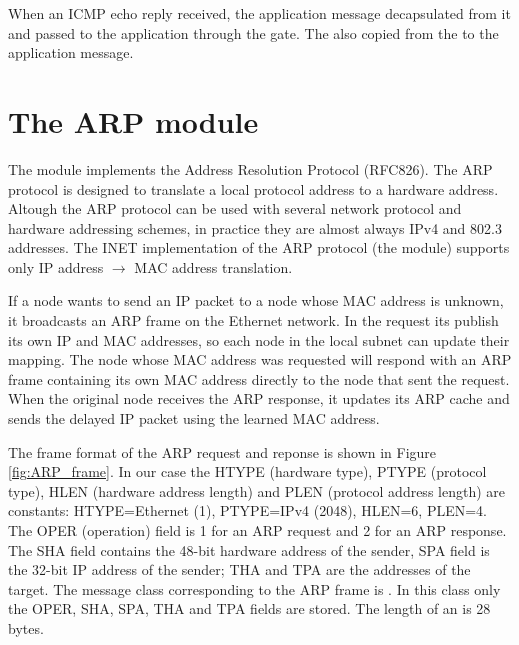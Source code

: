 When an ICMP echo reply received, the application message decapsulated
from it and passed to the application through the  gate.
The  also copied from the 
to the application message. 



\section{The ARP module}

The  module implements the Address Resolution Protocol (RFC826).
The ARP protocol is designed to translate a local protocol address
to a hardware address. Altough the ARP protocol can be used with
several network protocol and hardware addressing schemes, in practice
they are almost always IPv4 and 802.3 addresses. The INET implementation
of the ARP protocol (the  module) supports only
IP address $\rightarrow$ MAC address translation. 

If a node wants to send an IP packet to a node whose MAC address is unknown,
it broadcasts an ARP frame on the Ethernet network.
In the request its publish its own IP and
MAC addresses, so each node in the local subnet can update their mapping.
The node whose MAC address was requested will respond with an ARP frame
containing its own MAC address directly to the node that sent the
request. When the original node receives the ARP response, it updates 
its ARP cache and sends the delayed IP packet using the learned MAC address.

The frame format of the ARP request and reponse is shown in Figure \ref{fig:ARP_frame}.
In our case the HTYPE (hardware type), PTYPE (protocol type), HLEN (hardware address length)
and PLEN (protocol address length) are constants: HTYPE=Ethernet (1), PTYPE=IPv4 (2048), HLEN=6,
PLEN=4. The OPER (operation) field is 1 for an ARP request and 2 for an ARP response.
The SHA field contains the 48-bit hardware address of the sender, SPA field is
the 32-bit IP address of the sender; THA and TPA are the addresses of the target.
The message class corresponding to the ARP frame is .
In this class only the OPER, SHA, SPA, THA and TPA fields are stored.
The length of an  is 28 bytes.


